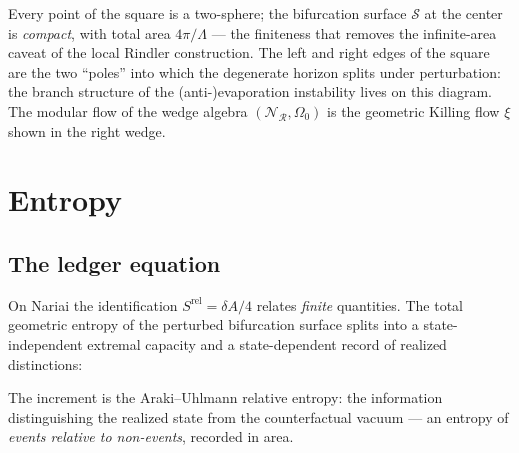 \documentclass[11pt]{article}
\newcommand{\Srel}{S^{\mathrm{rel}}}
\begin{document}
\noindent
Every point of the square is a two-sphere; the bifurcation surface $\mathcal{S}$ at the center is \emph{compact}, with total area $4\pi/\Lambda$ --- the finiteness that removes the infinite-area caveat of the local Rindler construction. The left and right edges of the square are the two ``poles'' into which the degenerate horizon splits under perturbation: the branch structure of the (anti-)evaporation instability lives on this diagram. The modular flow of the wedge algebra $(\mathscr{N}_{\mathcal{R}}, \Omega_0)$ is the geometric Killing flow $\xi$ shown in the right wedge.

\section{Entropy}
\label{sec:ent}

\subsection{The ledger equation}

On \mbox{Nariai} the identification $\Srel = \delta A/4$ relates \emph{finite} quantities. The total geometric entropy of the perturbed bifurcation surface splits into a state-independent extremal capacity and a state-dependent record of realized distinctions:

\begin{center}
\end{center}

\noindent
The increment is the Araki--Uhlmann relative entropy: the information distinguishing the realized state from the counterfactual vacuum --- an entropy of \emph{events relative to non-events}, recorded in area.
\end{document}
